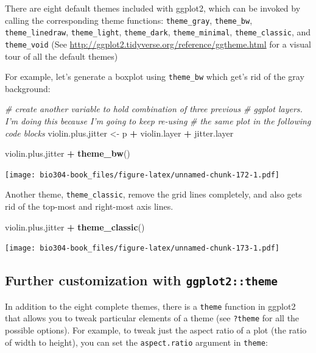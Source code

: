 \documentclass[]{book}
\newenvironment{Shaded}{\begin{snugshade}}{\end{snugshade}}
\newcommand{\CommentTok}[1]{\textcolor[rgb]{0.56,0.35,0.01}{\textit{#1}}}
\newcommand{\KeywordTok}[1]{\textcolor[rgb]{0.13,0.29,0.53}{\textbf{#1}}}
\newcommand{\NormalTok}[1]{#1}
\newcommand{\OperatorTok}[1]{\textcolor[rgb]{0.81,0.36,0.00}{\textbf{#1}}}
\newcommand{\StringTok}[1]{\textcolor[rgb]{0.31,0.60,0.02}{#1}}
\theoremstyle{definition}
\theoremstyle{definition}
\theoremstyle{definition}
\theoremstyle{remark}
\begin{document}
There are eight default themes included with ggplot2, which can be
invoked by calling the corresponding theme functions:
\texttt{theme\_gray}, \texttt{theme\_bw}, \texttt{theme\_linedraw},
\texttt{theme\_light}, \texttt{theme\_dark}, \texttt{theme\_minimal},
\texttt{theme\_classic}, and \texttt{theme\_void} (See
\url{http://ggplot2.tidyverse.org/reference/ggtheme.html} for a visual
tour of all the default themes)

For example, let's generate a boxplot using \texttt{theme\_bw} which
get's rid of the gray background:

\begin{Shaded}
\begin{Highlighting}[]
\CommentTok{# create another variable to hold combination of three previous }
\CommentTok{# ggplot layers. I'm doing this because I'm going to keep re-using}
\CommentTok{# the same plot in the following code blocks}
\NormalTok{violin.plus.jitter <-}\StringTok{ }\NormalTok{p }\OperatorTok{+}\StringTok{ }\NormalTok{violin.layer }\OperatorTok{+}\StringTok{ }\NormalTok{jitter.layer}

\NormalTok{violin.plus.jitter }\OperatorTok{+}\StringTok{ }\KeywordTok{theme_bw}\NormalTok{()}
\end{Highlighting}
\end{Shaded}

\texttt{[image: bio304-book\_files/figure-latex/unnamed-chunk-172-1.pdf]}

Another theme, \texttt{theme\_classic}, remove the grid lines
completely, and also gets rid of the top-most and right-most axis lines.

\begin{Shaded}
\begin{Highlighting}[]
\NormalTok{violin.plus.jitter }\OperatorTok{+}\StringTok{ }\KeywordTok{theme_classic}\NormalTok{()}
\end{Highlighting}
\end{Shaded}

\texttt{[image: bio304-book\_files/figure-latex/unnamed-chunk-173-1.pdf]}

\hypertarget{further-customization-with-ggplot2theme}{%
\subsection{\texorpdfstring{Further customization with
\texttt{ggplot2::theme}}{Further customization with ggplot2::theme}}\label{further-customization-with-ggplot2theme}}

In addition to the eight complete themes, there is a \texttt{theme}
function in ggplot2 that allows you to tweak particular elements of a
theme (see \texttt{?theme} for all the possible options). For example,
to tweak just the aspect ratio of a plot (the ratio of width to height),
you can set the \texttt{aspect.ratio} argument in \texttt{theme}:
\end{document}
